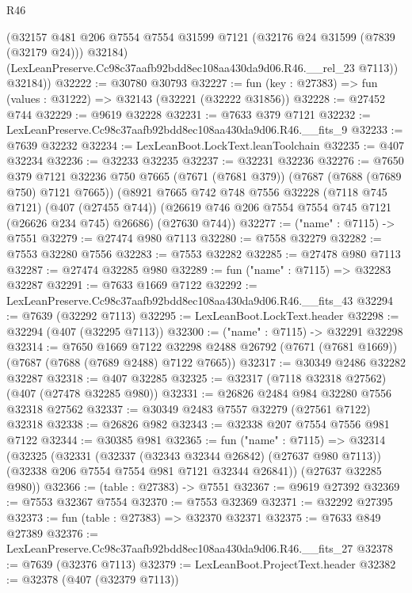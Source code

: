 \begin{lexlean}{R46}
\begin{coremodule}
          (@32157
            @481
            @206
            @7554
            @7554
            @31599
            @7121
            (@32176 @24 @31599 (@7839 (@32179 @24)))
            @32184)
          (LexLeanPreserve.Cc98c37aafb92bdd8ec108aa430da9d06.R46.__rel_23 @7113))
        @32184))
@32222 := @30780 @30793
@32227 := fun (key : @27383) => fun (values : @31222) => @32143 (@32221 (@32222 @31856))
@32228 := @27452 @744
@32229 := @9619 @32228
@32231 := @7633 @379 @7121
@32232 := LexLeanPreserve.Cc98c37aafb92bdd8ec108aa430da9d06.R46.__fits_9
@32233 := @7639 @32232
@32234 := LexLeanBoot.LockText.leanToolchain
@32235 := @407 @32234
@32236 := @32233 @32235
@32237 := @32231 @32236
@32276 := @7650
    @379
    @7121
    @32236
    @750
    @7665
    (@7671 (@7681 @379))
    (@7687 (@7688 (@7689 @750) @7121 @7665))
    (@8921
      @7665
      @742
      @748
      @7556
      @32228
      (@7118 @745 @7121)
      (@407 (@27455 @744))
      (@26619 @746 @206 @7554 @7554 @745 @7121 (@26626 @234 @745) @26686)
      (@27630 @744))
@32277 := ("name" : @7115) -> @7551
@32279 := @27474 @980 @7113
@32280 := @7558 @32279
@32282 := @7553 @32280 @7556
@32283 := @7553 @32282
@32285 := @27478 @980 @7113
@32287 := @27474 @32285 @980
@32289 := fun ("name" : @7115) => @32283 @32287
@32291 := @7633 @1669 @7122
@32292 := LexLeanPreserve.Cc98c37aafb92bdd8ec108aa430da9d06.R46.__fits_43
@32294 := @7639 (@32292 @7113)
@32295 := LexLeanBoot.LockText.header
@32298 := @32294 (@407 (@32295 @7113))
@32300 := ("name" : @7115) -> @32291 @32298
@32314 := @7650
    @1669
    @7122
    @32298
    @2488
    @26792
    (@7671 (@7681 @1669))
    (@7687 (@7688 (@7689 @2488) @7122 @7665))
@32317 := @30349 @2486 @32282 @32287
@32318 := @407 @32285
@32325 := @32317 (@7118 @32318 @27562) (@407 (@27478 @32285 @980))
@32331 := @26826 @2484 @984 @32280 @7556 @32318 @27562
@32337 := @30349 @2483 @7557 @32279 (@27561 @7122) @32318
@32338 := @26826 @982
@32343 := @32338 @207 @7554 @7556 @981 @7122
@32344 := @30385 @981
@32365 := fun ("name" : @7115) =>
  @32314
    (@32325
      (@32331
        (@32337 (@32343 @32344 @26842) (@27637 @980 @7113))
        (@32338 @206 @7554 @7554 @981 @7121 @32344 @26841))
      (@27637 @32285 @980))
@32366 := (table : @27383) -> @7551
@32367 := @9619 @27392
@32369 := @7553 @32367 @7554
@32370 := @7553 @32369
@32371 := @32292 @27395
@32373 := fun (table : @27383) => @32370 @32371
@32375 := @7633 @849 @27389
@32376 := LexLeanPreserve.Cc98c37aafb92bdd8ec108aa430da9d06.R46.__fits_27
@32378 := @7639 (@32376 @7113)
@32379 := LexLeanBoot.ProjectText.header
@32382 := @32378 (@407 (@32379 @7113))

\end{coremodule}
\end{lexlean}
